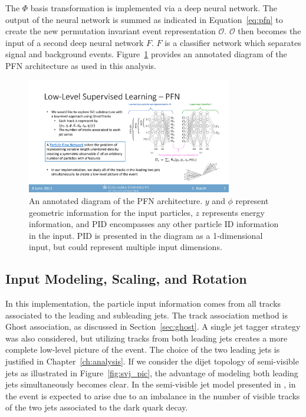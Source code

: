 The $\Phi$ basis transformation is implemented via a deep neural network. The output of the neural network is summed as indicated in Equation~\ref{eq:pfn} to create the new permutation invariant event representation $\mathcal{O}$. $\mathcal{O}$ then becomes the input of a second deep neural network $F$. $F$ is a classifier network which separates signal and background events. Figure~\ref{fig:pfn_arch} provides an annotated diagram of the PFN architecture as used in this analysis. 
\begin{figure}[!htbp]
\centering
   \includegraphics[width=0.8\textwidth]{figures/ml/pfn_arch}
    \caption{An annotated diagram of the PFN architecture. $y$ and $\phi$ represent geometric information for the input particles, $z$ represents energy information, and PID encompasses any other particle ID information in the input. PID is presented in the diagram as a 1-dimensional input, but could represent multiple input dimensions.
        \label{fig:pfn_arch}}
\end{figure}

\subsection{Input Modeling, Scaling, and Rotation}
\label{sec:input_model}
In this implementation, the particle input information comes from all tracks associated to the leading and subleading jets. The track association method is Ghost association, as discussed in Section~\ref{sec:ghost}. A single jet tagger strategy was also considered, but utilizing tracks from both leading jets creates a more complete low-level picture of the event. The choice of the two leading jets is justified in Chapter~\ref{ch:analysis}. If we consider the dijet topology of semi-visible jets as illustrated in Figure~\ref{fig:svj_pic}, the advantage of modeling both leading jets simultaneously becomes clear. In the semi-visible jet model presented in \cite{darkqcd}, \met in the event is expected to arise due to an imbalance in the number of visible tracks of the two jets associated to the dark quark decay.\par

